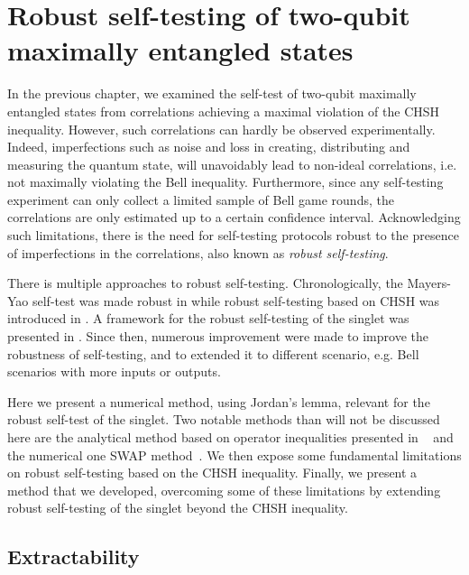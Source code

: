\chapter{Robust self-testing of two-qubit maximally entangled states}
\label{chap:robust}

In the previous chapter, we examined the self-test of two-qubit maximally entangled states from correlations achieving a maximal violation of the CHSH inequality.
However, such correlations can hardly be observed experimentally. 
Indeed, imperfections such as noise and loss in creating, distributing and measuring the quantum state, will unavoidably lead to non-ideal correlations, i.e. not maximally violating the Bell inequality.
Furthermore, since any self-testing experiment can only collect a limited sample of Bell game rounds, the correlations are only estimated up to a certain confidence interval. %
Acknowledging such limitations, there is the need for self-testing protocols robust to the presence of imperfections in the correlations, also known as \textit{robust self-testing}.

There is multiple approaches to robust self-testing. 
Chronologically, the Mayers-Yao self-test was made robust in \cite{Magniez2006} while robust self-testing based on CHSH was introduced in \cite{Bardyn2009}.
A framework for the robust self-testing of the singlet was presented in \cite{McKague2012}.
Since then, numerous improvement were made to improve the robustness of self-testing, and to extended it to different scenario, e.g. Bell scenarios with more inputs or outputs.

Here we present a numerical method, using Jordan's lemma, relevant for the robust self-test of the singlet. 
Two notable methods than will not be discussed here are the analytical method based on operator inequalities presented in ~\cite{Kaniewski2016} and the numerical one SWAP method~\cite{Bancal2015}.
We then expose some fundamental limitations on robust self-testing based on the CHSH inequality.
Finally, we present a method that we developed, overcoming some of these limitations by extending robust self-testing of the singlet beyond the CHSH inequality.

\section{Extractability}
\label{sec:extractability}

